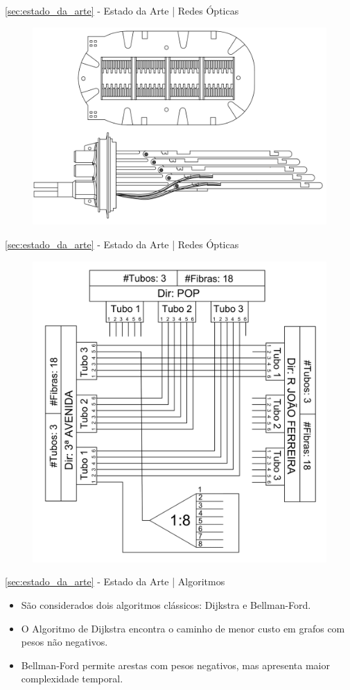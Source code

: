 \documentclass[aspectratio=169,xcolor=dvipsnames]{beamer}
\begin{document}
\begin{frame}{\ref{sec:estado_da_arte} - Estado da Arte | Redes Ópticas}
  \begin{figure}
    \includegraphics[width=0.5\linewidth]{../images/caixa_emenda_detalhe_bandejas.png}
  \end{figure}
\end{frame}

\begin{frame}{\ref{sec:estado_da_arte} - Estado da Arte | Redes Ópticas}
  \begin{figure}
    \includegraphics[width=0.45\linewidth]{../images/diagrama_fusoes.png}
  \end{figure}
\end{frame}

\begin{frame}{\ref{sec:estado_da_arte} - Estado da Arte | Algoritmos}
  \begin{itemize}
    \item São considerados dois algoritmos clássicos: Dijkstra e Bellman-Ford.
    \item O Algoritmo de Dijkstra encontra o caminho de menor custo em grafos com pesos não negativos.
    \item Bellman-Ford permite arestas com pesos negativos, mas apresenta maior complexidade temporal.
  \end{itemize}
\end{frame}
\end{document}
